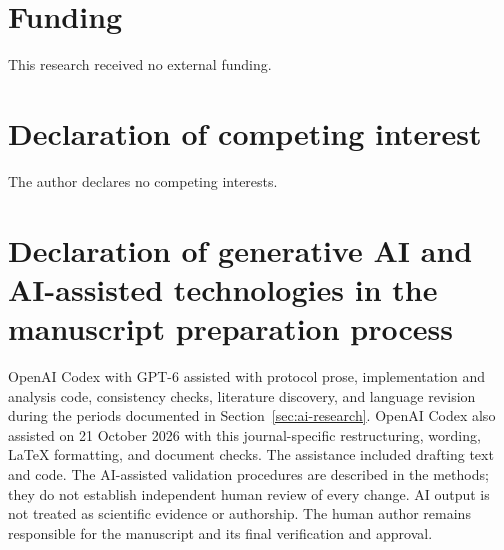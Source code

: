 \section*{Funding}
This research received no external funding.

\section*{Declaration of competing interest}
The author declares no competing interests.

\section*{Declaration of generative AI and AI-assisted technologies in the manuscript preparation process}
OpenAI Codex with GPT-6 assisted with protocol prose, implementation and analysis code, consistency checks, literature discovery, and language revision during the periods documented in Section~\ref{sec:ai-research}. OpenAI Codex also assisted on 21 October 2026 with this journal-specific restructuring, wording, LaTeX formatting, and document checks. The assistance included drafting text and code. The AI-assisted validation procedures are described in the methods; they do not establish independent human review of every change. AI output is not treated as scientific evidence or authorship. The human author remains responsible for the manuscript and its final verification and approval.
